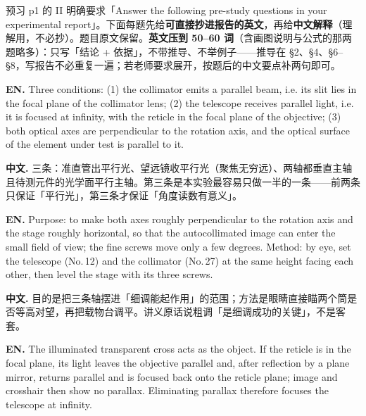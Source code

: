 \documentclass[11pt]{ctexart}
\begin{document}

预习 p1 的 II 明确要求「Answer the following pre-study questions in your experimental report」。下面每题先给\textbf{可直接抄进报告的英文}，再给\textbf{中文解释}（理解用，不必抄）。题目原文保留。\textbf{英文压到 50--60 词}（含画图说明与公式的那两题略多）：只写「结论 + 依据」，不带推导、不举例子——推导在 §2、§4、§6--§8，写报告不必重复一遍；若老师要求展开，按题后的中文要点补两句即可。



\textbf{EN.} Three conditions: (1) the collimator emits a parallel beam, i.e. its slit lies in the focal plane of the collimator lens; (2) the telescope receives parallel light, i.e. it is focused at infinity, with the reticle in the focal plane of the objective; (3) both optical axes are perpendicular to the rotation axis, and the optical surface of the element under test is parallel to it.

\textbf{中文.} 三条：准直管出平行光、望远镜收平行光（聚焦无穷远）、两轴都垂直主轴且待测元件的光学面平行主轴。第三条是本实验最容易只做一半的一条——前两条只保证「平行光」，第三条才保证「角度读数有意义」。



\textbf{EN.} Purpose: to make both axes roughly perpendicular to the rotation axis and the stage roughly horizontal, so that the autocollimated image can enter the small field of view; the fine screws move only a few degrees. Method: by eye, set the telescope (No.\,12) and the collimator (No.\,27) at the same height facing each other, then level the stage with its three screws.

\textbf{中文.} 目的是把三条轴摆进「细调能起作用」的范围；方法是眼睛直接瞄两个筒是否等高对望，再把载物台调平。讲义原话说粗调「是细调成功的关键」，不是客套。



\textbf{EN.} The illuminated transparent cross acts as the object. If the reticle is in the focal plane, its light leaves the objective parallel and, after reflection by a plane mirror, returns parallel and is focused back onto the reticle plane; image and crosshair then show no parallax. Eliminating parallax therefore focuses the telescope at infinity.
\end{document}
